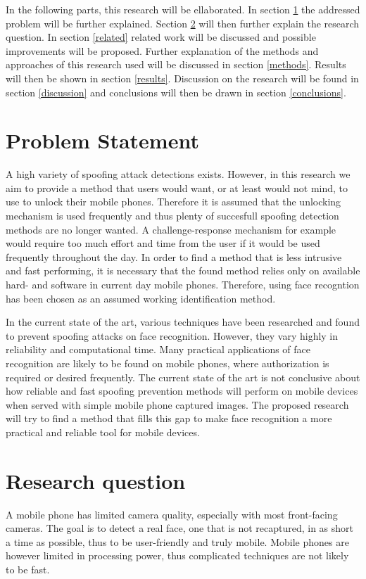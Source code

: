 \documentclass{sig-alternate-br}
\begin{document}
In the following parts, this research will be ellaborated. In section \ref{problem} the addressed problem will be further explained. Section \ref{question} will then further explain the research question. In section \ref{related} related work will be discussed and possible improvements will be proposed. Further explanation of the methods and approaches of this research used will be discussed in section \ref{methods}. Results will then be shown in section \ref{results}. Discussion on the research will be found in section \ref{discussion} and conclusions will then be drawn in section \ref{conclusions}.

\section{Problem Statement} \label{problem}
A high variety of spoofing attack detections exists. However, in this research we aim to provide a method that users would want, or at least would not mind, to use to unlock their mobile phones. Therefore it is assumed that the unlocking mechanism is used frequently and thus plenty of succesfull spoofing detection methods are no longer wanted. A challenge-response mechanism for example would require too much effort and time from the user if it would be used frequently throughout the day. In order to find a method that is less intrusive and fast performing, it is necessary that the found method relies only on available hard- and software in current day mobile phones. Therefore, using face recogntion has been chosen as an assumed working identification method.

In the current state of the art, various techniques have been researched and found to prevent spoofing attacks on face recognition. However, they vary highly in reliability and computational time. Many practical applications of face recognition are likely to be found on mobile phones, where authorization is required or desired frequently. The current state of the art is not conclusive about how reliable and fast spoofing prevention methods will perform on mobile devices when served with simple mobile phone captured images. The proposed research will try to find a method that fills this gap to make face recognition a more practical and reliable tool for mobile devices.

\section{Research question} \label{question}
A mobile phone has limited camera quality, especially with most front-facing cameras. The goal is to detect a real face, one that is not recaptured, in as short a time as possible, thus to be user-friendly and truly mobile. Mobile phones are however limited in processing power, thus complicated techniques are not likely to be fast.
\end{document}
